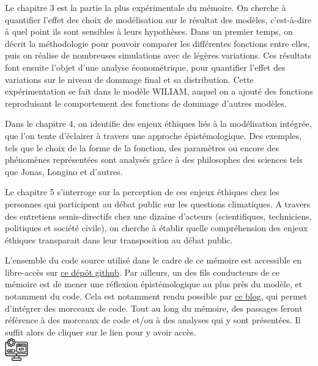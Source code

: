 Le chapitre 3 est la partie la plus expérimentale du mémoire. On cherche à quantifier l'effet des choix de modélisation sur le résultat des modèles, c'est-à-dire à quel point ils sont sensibles à leurs hypothèses. Dans un premier temps, on décrit la méthodologie pour pouvoir comparer les différentes fonctions entre elles, puis on réalise de nombreuses simulations avec de légères variations. Ces résultats font ensuite l'objet d'une analyse économétrique, pour quantifier l'effet des variations sur le niveau de dommage final et sa distribution. Cette expérimentation se fait dans le modèle WILIAM, auquel on a ajouté des fonctions reproduisant le comportement des fonctions de dommage d'autres modèles.

Dans le chapitre 4, on identifie des enjeux éthiques liés à la modélisation intégrée, que l'on tente d'éclairer à travers une approche épistémologique. Des exemples, tels que le choix de la forme de la fonction, des paramètres ou encore des phénomènes représentées sont analysés grâce à des philosophes des sciences tels que Jonas, Longino et d'autres. 


Le chapitre 5 s'interroge sur la perception de ces enjeux éthiques chez les personnes qui participent au débat public sur les questions climatiques. A travers des entretiens semis-directifs chez une dizaine d'acteurs (scientifiques, techniciens, politiques et société civile), on cherche à établir quelle compréhension des enjeux éthiques transparait dans leur transposition au débat public. 

\begin{tcolorbox}[title=Avertissement]
    L'ensemble du code source utilisé dans le cadre de ce mémoire est accessible en libre-accès sur \href{https://github.com/ggenelot/damage-functions-modeling}{ce dépôt github}. Par ailleurs, un des fils conducteurs de ce mémoire est de mener une réflexion épistémologique au plus près du modèle, et notamment du code. Cela est notamment rendu possible par \href{https://damage-functions-modeling.readthedocs.io/en/latest/index.html}{ce blog}, qui permet d'intégrer des morceaux de code. Tout au long du mémoire, des passages feront référence à des morceaux de code et/ou à des analyses qui y sont présentées. Il suffit alors de cliquer sur le lien pour y avoir accès. \\


    \includegraphics[width=1cm]{figures/logos/development.png}


    
\end{tcolorbox}

